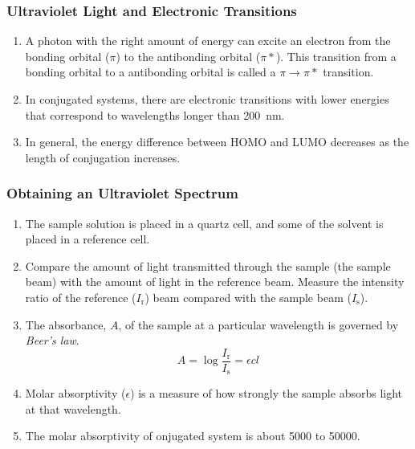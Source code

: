 \subsubsection{Ultraviolet Light and Electronic Transitions}

\begin{enumerate}
    \item A photon with the right amount of energy can excite an electron from the bonding orbital ($ \pi $) to the antibonding orbital ($ \pi* $). This transition from a bonding orbital to a antibonding orbital is called a $ \pi \rightarrow \pi* $ transition.

    \item In conjugated systems, there are electronic transitions with lower energies that correspond to wavelengths longer than \qty{200}{\nano\meter}.

    \item In general, the energy difference between HOMO and LUMO decreases as the length of conjugation increases.
\end{enumerate}

\subsubsection{Obtaining an Ultraviolet Spectrum}

\begin{enumerate}
    \item The sample solution is placed in a quartz cell, and some of the solvent is placed in a reference cell.
    \item Compare the amount of light transmitted through the sample (the sample beam) with the amount of light in the reference beam. Measure the intensity ratio of the reference ($ I_\text{r} $) beam compared with the sample beam ($ I_\text{s} $).
    \item The absorbance, $ A $, of the sample at a particular wavelength is governed by \textit{Beer’s law}.
    \begin{equation*}
        A = \log{\frac{I_\text{r}}{I_\text{s}}} = \epsilon c l
    \end{equation*}
    \item Molar absorptivity ($ \epsilon $) is a measure of how strongly the sample absorbs light at that wavelength.
    \item The molar absorptivity of onjugated system is about 5000 to 50000.  %
\end{enumerate}

